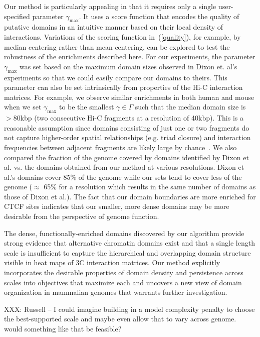 \documentclass[12pt]{cmuthesis}
\begin{document}
  Our method is particularly appealing in that it requires only a single user-specified parameter $\gamma_{\text{max}}$. It uses a score function that encodes the quality of putative domains in an intuitive manner based on their local density of interactions.  Variations of the scoring function in~(\ref{quality}), for example, by median centering rather than mean centering, can be explored to test the robustness of the enrichments described here. For our experiments, the parameter $\gamma_{\max}$ was set based on the maximum domain sizes observed in Dixon et. al's experiments so that we could easily compare our domains to theirs.  This parameter can also be set intrinsically from properties of the Hi-C interaction matrices.  For example, we observe similar enrichments in both human and mouse when we set $\gamma_{\max}$ to be the smallest $\gamma \in \Gamma$ such that the median domain size is $>$80kbp (two consecutive Hi-C fragments at a resolution of 40kbp). This is a reasonable assumption since domains consisting of just one or two fragments do not capture higher-order spatial relationships (e.g. triad closure) and interaction frequencies between adjacent fragments are likely large by chance~\cite{LiebAid2009}.  We also compared the fraction of the genome covered by domains identified by Dixon et al. vs. the domains obtained from our method at various resolutions.  Dixon et al.'s domains cover 85\% of the genome while our sets tend to cover less of the genome ($\approx$ 65\% for a resolution which results in the same number of domains as those of Dixon et al.).  The fact that our domain boundaries are more enriched for CTCF sites indicates that our smaller, more dense domains may be more desirable from the perspective of genome function.

  The dense, functionally-enriched domains discovered by our algorithm provide strong evidence that alternative chromatin domains exist and that a single length scale is insufficient to capture the hierarchical and overlapping domain structure visible in heat maps of 3C interaction matrices. Our method explicitly incorporates the desirable properties of domain density and persistence across scales into objectives that maximize each and uncovers a new view of domain organization in mammalian genomes that warrants further investigation.


  XXX: Russell -- I could imagine building in a model complexity penalty to choose the best-supported scale and maybe even allow that to vary across genome. would something like that be feasible?
\end{document}
